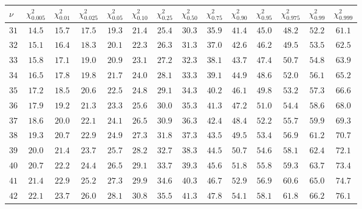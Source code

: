 
\begin{table}[htb!]
\begin{center}
{\scriptsize
\renewcommand\arraystretch{1.250000}
\begin{tabular}{p{22 pt}ccccccccccccc}
\hline

\rule[-2pt]{0pt}{14pt}$\nu$ & $\chi^2_{0.005}$ & $\chi^2_{0.01}$ & $\chi^2_{0.025}$ & $\chi^2_{0.05}$ & $\chi^2_{0.10}$ & $\chi^2_{0.25}$ & $\chi^2_{0.50}$ & $\chi^2_{0.75}$ & $\chi^2_{0.90}$ & $\chi^2_{0.95}$ & $\chi^2_{0.975}$ & $\chi^2_{0.99}$ & $\chi^2_{0.999}$\\
\hline
\hline
\rule[0pt]{0pt}{15pt}$31$ & $14.5$ & $15.7$ & $17.5$ & $19.3$ & $21.4$ & $25.4$ & $30.3$ & $35.9$ & $41.4$ & $45.0$ & $48.2$ & $52.2$ & $61.1$\\
$32$ & $15.1$ & $16.4$ & $18.3$ & $20.1$ & $22.3$ & $26.3$ & $31.3$ & $37.0$ & $42.6$ & $46.2$ & $49.5$ & $53.5$ & $62.5$\\
$33$ & $15.8$ & $17.1$ & $19.0$ & $20.9$ & $23.1$ & $27.2$ & $32.3$ & $38.1$ & $43.7$ & $47.4$ & $50.7$ & $54.8$ & $63.9$\\
$34$ & $16.5$ & $17.8$ & $19.8$ & $21.7$ & $24.0$ & $28.1$ & $33.3$ & $39.1$ & $44.9$ & $48.6$ & $52.0$ & $56.1$ & $65.2$\\
$35$ & $17.2$ & $18.5$ & $20.6$ & $22.5$ & $24.8$ & $29.1$ & $34.3$ & $40.2$ & $46.1$ & $49.8$ & $53.2$ & $57.3$ & $66.6$\\
$36$ & $17.9$ & $19.2$ & $21.3$ & $23.3$ & $25.6$ & $30.0$ & $35.3$ & $41.3$ & $47.2$ & $51.0$ & $54.4$ & $58.6$ & $68.0$\\
$37$ & $18.6$ & $20.0$ & $22.1$ & $24.1$ & $26.5$ & $30.9$ & $36.3$ & $42.4$ & $48.4$ & $52.2$ & $55.7$ & $59.9$ & $69.3$\\
$38$ & $19.3$ & $20.7$ & $22.9$ & $24.9$ & $27.3$ & $31.8$ & $37.3$ & $43.5$ & $49.5$ & $53.4$ & $56.9$ & $61.2$ & $70.7$\\
$39$ & $20.0$ & $21.4$ & $23.7$ & $25.7$ & $28.2$ & $32.7$ & $38.3$ & $44.5$ & $50.7$ & $54.6$ & $58.1$ & $62.4$ & $72.1$\\
$40$ & $20.7$ & $22.2$ & $24.4$ & $26.5$ & $29.1$ & $33.7$ & $39.3$ & $45.6$ & $51.8$ & $55.8$ & $59.3$ & $63.7$ & $73.4$\\
$41$ & $21.4$ & $22.9$ & $25.2$ & $27.3$ & $29.9$ & $34.6$ & $40.3$ & $46.7$ & $52.9$ & $56.9$ & $60.6$ & $65.0$ & $74.7$\\
$42$ & $22.1$ & $23.7$ & $26.0$ & $28.1$ & $30.8$ & $35.5$ & $41.3$ & $47.8$ & $54.1$ & $58.1$ & $61.8$ & $66.2$ & $76.1$\\

\end{tabular}}
\end{center}
\end{table}
